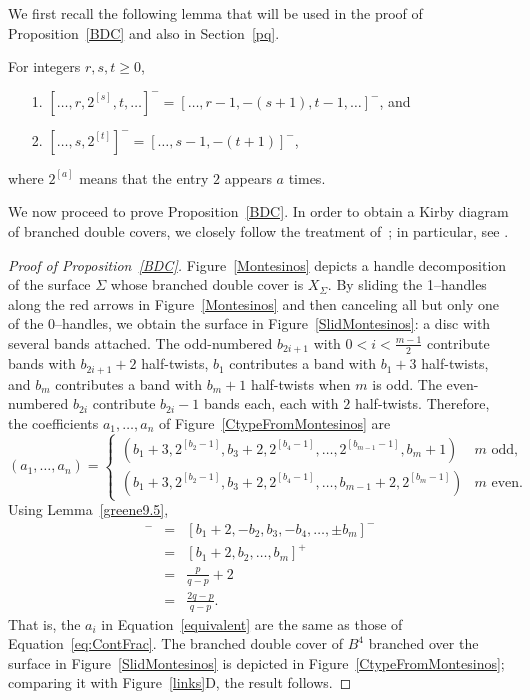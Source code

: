 We first recall the following lemma that will be used in the proof of Proposition~\ref{BDC} and also in Section~\ref{pq}. 
\begin{lemma}\label{greene9.5}
For integers $r,s,t \ge 0$,
\begin{itemize}
    \item[1.] $[\dots,r,2^{[s]},t,\dots]^- = [\dots, r-1, -(s+1), t-1,\dots]^-$, and
    \item[2.] $[\dots, s, 2^{[t]}]^- = [\dots, s-1, -(t+1)]^-$,
\end{itemize}
where $2^{[a]}$ means that the entry $2$ appears $a$ times.
\end{lemma}

We now proceed to prove Proposition~\ref{BDC}. In order to obtain a Kirby diagram of branched double covers, we closely follow the treatment of~\cite{AkbulutKirby1980}; in particular, see \cite[Figure~4]{AkbulutKirby1980}.

\begin{proof}[Proof of Proposition~\ref{BDC}]
Figure~\ref{Montesinos} depicts a handle decomposition of the surface $\Sigma$ whose branched double cover is $X_\Sigma$. By sliding the 1--handles along the red arrows in Figure~\ref{Montesinos} and then canceling all but only one of the 0--handles, we obtain the surface in Figure~\ref{SlidMontesinos}: a disc with several bands attached. The odd-numbered $b_{2i+1}$ with $0<i<\frac{m-1}2$ contribute bands with $b_{2i+1} + 2$ half-twists, $b_1$ contributes a band with $b_1 + 3$ half-twists, and $b_m$ contributes a band with $b_m + 1$ half-twists when $m$ is odd. The even-numbered $b_{2i}$ contribute $b_{2i} - 1$ bands each, each with $2$ half-twists. Therefore, the coefficients $a_1,\dots, a_n$ of Figure~\ref{CtypeFromMontesinos} are
\begin{equation}\label{equivalent}
(a_1,\dots,a_n) = \begin{cases}
(b_1 + 3, 2^{[b_2 - 1]}, b_3 + 2, 2^{[b_4 - 1]},\dots,2^{[b_{m-1} - 1]},b_m + 1) & m\text{ odd}, \\
(b_1 + 3, 2^{[b_2 - 1]}, b_3 + 2, 2^{[b_4 - 1]},\dots,b_{m-1} + 2,2^{[b_{m} - 1]}) & m\text{ even}.
\end{cases}
\end{equation}
 Using Lemma~\ref{greene9.5}, 
\begin{eqnarray*}
[a_1,\dots,a_n]^-& =& [b_1 + 2, -b_2, b_3, -b_4, \dots, \pm b_m]^-\\ &=& [b_1 + 2, b_2,\dots,b_m]^+ \\ & =& \frac{p}{q-p} + 2 \\ & =& \frac{2q-p}{q-p}. 
\end{eqnarray*} 
That is, the $a_i$ in Equation~\eqref{equivalent} are the same as those of Equation~\eqref{eq:ContFrac}. The branched double cover of $B^4$ branched over the surface in Figure~\ref{SlidMontesinos} is depicted in Figure~\ref{CtypeFromMontesinos}; comparing it with Figure~\ref{links}D, the result follows.
\end{proof}

